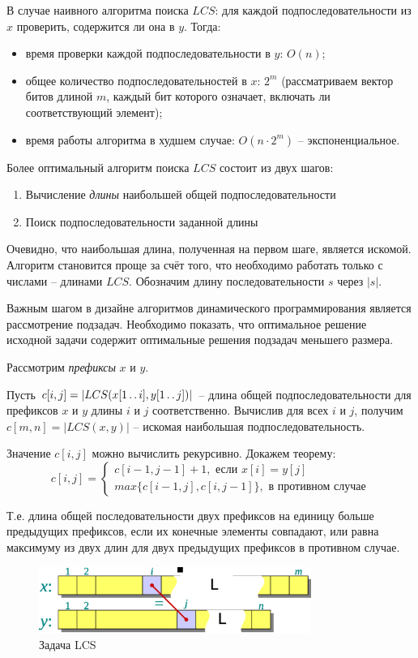 \documentclass[a4paper,11pt]{article}
\begin{document}
В случае наивного алгоритма поиска $LCS$: для каждой подпоследовательности из
$x$ проверить, содержится ли она в $y$. Тогда:
\begin{itemize}
\item время проверки каждой подпоследовательности в $y$: $O(n)$;
\item общее количество подпоследовательностей в $x$: $2^m$ (рассматриваем вектор
битов длиной $m$, каждый бит которого означает, включать ли соответствующий
элемент);
\item время работы алгоритма в худшем случае: $O(n \cdot 2^m)$ -- экспоненциальное.
\end{itemize}

Более оптимальный алгоритм поиска $LCS$ состоит из двух шагов:
\begin{enumerate}
\item Вычисление \emph{длины} наибольшей общей подпоследовательности
\item Поиск подпоследовательности заданной длины
\end{enumerate}

Очевидно, что наибольшая длина, полученная на первом шаге, является искомой.
Алгоритм становится проще за счёт того, что необходимо работать только с
числами -- длинами $LCS$. Обозначим длину последовательности $s$ через $|s|$.

Важным шагом в дизайне алгоритмов динамического программирования является
рассмотрение подзадач. Необходимо показать, что оптимальное решение исходной
задачи содержит оптимальные решения подзадач меньшего размера.

Рассмотрим \emph{префиксы} $x$ и $y$. 

Пусть $c[i, j] = |LCS(x[1 \mathinner{\ldotp\ldotp} i], y[1 \mathinner{\ldotp\ldotp} j])|$ -- длина общей
подпоследовательности для префиксов $x$ и $y$ длины $i$ и $j$
соответственно. Вычислив для всех $i$ и $j$, получим
$c[m, n] = |LCS(x, y)|$ -- искомая наибольшая подпоследовательность.

Значение $c[i, j]$ можно вычислить рекурсивно. Докажем теорему:
\begin{equation*}
  c[i, j] = \begin{cases}
    c[i-1, j-1] + 1, \text{ если } x[i] = y[j] \\
    max\{c[i-1, j], c[i, j-1]\}, \text{ в противном случае}
    \end{cases}
\end{equation*}

Т.е. длина общей последовательности двух префиксов на единицу больше
предыдущих префиксов, если их конечные элементы совпадают, или равна
максимуму из двух длин для двух предыдущих префиксов в противном случае.
\begin{figure}[ht]
  \centering
  \includegraphics[width=3.5in]{lecture8/lcs.eps}
  \caption{Задача LCS}
\end{figure}
\end{document}
